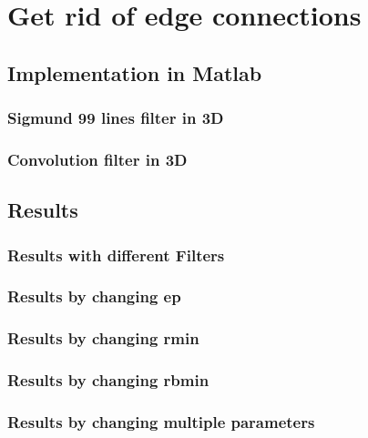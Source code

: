 
\chapter{Get rid of edge connections}
\section{Implementation in Matlab}
\subsection{Sigmund 99 lines filter in 3D}
\subsection{Convolution filter in 3D}
\section{Results}
\subsection{Results with different Filters}
\subsection{Results by changing ep}
\subsection{Results by changing rmin}
\subsection{Results by changing rbmin}
\subsection{Results by changing multiple parameters}